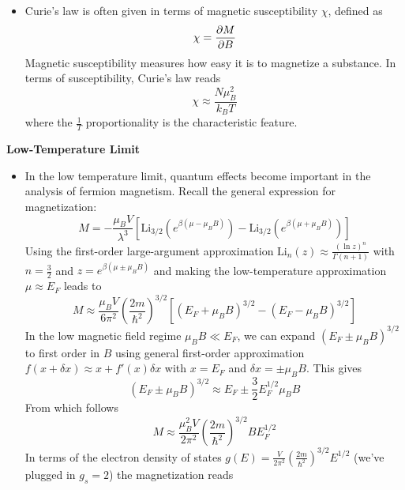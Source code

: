 \documentclass[11pt, a4paper]{article}
\begin{document}
\begin{itemize}
	\item Curie's law is often given in terms of magnetic susceptibility $ \chi $, defined as
	\begin{equation*}
		\chi = \pdv{M}{B}
	\end{equation*}
 	Magnetic susceptibility measures how easy it is to magnetize a substance. In terms of susceptibility, Curie's law reads
 	\begin{equation*}
	 	\chi \approx \frac{N\mu_{B}^{2}}{k_{B}T}
 	\end{equation*}
 	where the $ \frac{1}{T} $ proportionality is the characteristic feature.
 \end{itemize}

\textbf{Low-Temperature Limit}
 \begin{itemize}
 	\item In the low temperature limit, quantum effects become important in the analysis of fermion magnetism. Recall the general expression for magnetization:
	\begin{equation*}
		M = - \frac{\mu_{B}V}{\lambda^{3}} \left[\mathrm{Li}_{3/2}\left (e^{\beta(\mu - \mu_{B}B)}\right ) - \mathrm{Li}_{3/2}\left (e^{\beta(\mu + \mu_{B}B)}\right )\right]
	\end{equation*}
	Using the first-order large-argument approximation $ \mathrm{Li}_{n}(z) \approx \frac{(\ln z)^{n}}{\Gamma(n+1)} $ with $ n = \frac{3}{2} $ and $ z =  e^{\beta(\mu \pm \mu_{B}B)} $ and making the low-temperature approximation $ \mu \approx E_{F} $ leads to
	\begin{equation*}
		M \approx \frac{\mu_{B}V}{6\pi^{2}} \left(\frac{2m}{\hbar^{2}}\right)^{3/2}\left[(E_{F} + \mu_{B}B)^{3/2} - (E_{F} - \mu_{B}B)^{3/2}  \right]
	\end{equation*}
	In the low magnetic field regime $ \mu_{B}B \ll E_{F} $, we can expand $ (E_{F} \pm \mu_{B}B)^{3/2} $ to first order in $ B $ using general first-order approximation $ f(x + \delta x) \approx x + f'(x) \delta x $ with $ x = E_{F} $ and $ \delta x = \pm \mu_{B}B $. This gives
	\begin{equation*}
		(E_{F} \pm \mu_{B} B)^{3/2} \approx E_{F} \pm \frac{3}{2} E_{F}^{1/2} \mu_{B}B
	\end{equation*}
	From which follows
	\begin{equation*}
		M \approx \frac{\mu_{B}^{2}V}{2\pi^{2}} \left(\frac{2m}{\hbar^{2}}\right)^{3/2} B E_{F}^{1/2}
	\end{equation*} 
	In terms of the electron density of states $ g(E) = \frac{V}{2\pi^{2}}\left(\frac{2m}{\hbar^{2}}\right)^{3/2}E^{1/2}$ (we've plugged in $ g_{s} = 2 $) the magnetization reads

\end{itemize}
\end{document}
